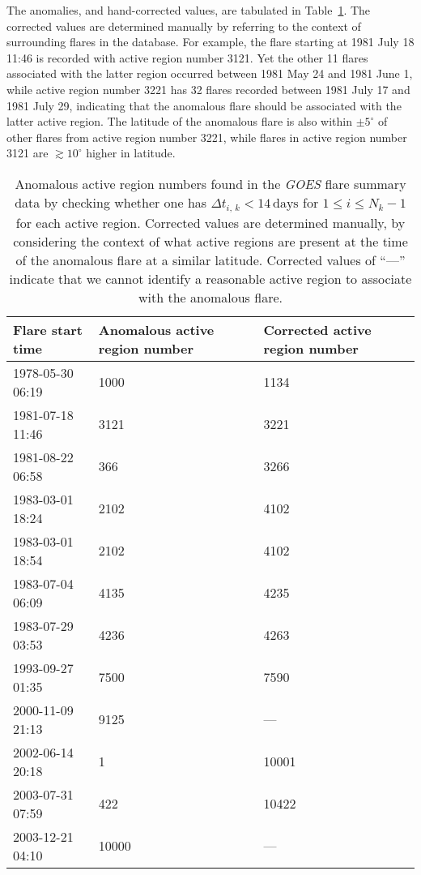 \begin{subappendices}
The anomalies, and hand-corrected values, are tabulated in Table~\ref{tab:cleaning}. The corrected values are determined manually by referring to the context of surrounding flares in the database. For example, the flare starting at 1981 July 18 11:46 is recorded with active region number 3121. Yet the other 11 flares associated with the latter region occurred between 1981 May 24 and 1981 June 1, while active region number 3221 has 32 flares recorded between 1981 July 17 and 1981 July 29, indicating that the anomalous flare should be associated with the latter active region. The latitude of the anomalous flare is also within $\pm 5^{\circ}$ of other flares from active region number 3221, while flares in active region number 3121 are $\gtrsim 10^{\circ}$ higher in latitude. 

\begin{table}
\centering
\caption{Anomalous active region numbers found in the \emph{GOES} flare summary data by checking whether one has $\Delta t_{i,\,k} < 14\,\textrm{days}$ for $1 \leq i \leq N_k - 1$ for each active region. Corrected values are determined manually, by considering the context of what active regions are present at the time of the anomalous flare at a similar latitude. Corrected values of ``---'' indicate that we cannot identify a reasonable active region to associate with the anomalous flare. } \label{tab:cleaning}
{\renewcommand{\arraystretch}{1.3}%
\begin{tabular}{l p{3.3cm} p{3.3cm}}
\toprule
Flare start time & Anomalous active region number & Corrected active region number \\
\midrule
1978-05-30 06:19 & 1000  & 1134  \\
1981-07-18 11:46 & 3121  & 3221  \\
1981-08-22 06:58 & 366   & 3266  \\
1983-03-01 18:24 & 2102  & 4102  \\
1983-03-01 18:54 & 2102  & 4102  \\
1983-07-04 06:09 & 4135  & 4235  \\
1983-07-29 03:53 & 4236  & 4263  \\
1993-09-27 01:35 & 7500  & 7590  \\
2000-11-09 21:13 & 9125  & ---   \\
2002-06-14 20:18 & 1     & 10001 \\
2003-07-31 07:59 & 422   & 10422 \\
2003-12-21 04:10 & 10000 & ---   \\

\end{tabular}}
\end{table}
\end{subappendices}
